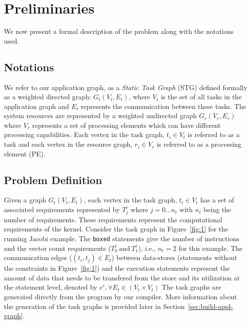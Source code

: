 \documentclass[10pt, conference, compsocconf]{IEEEtran}
\begin{document}
%
\IEEEpeerreviewmaketitle




\section{Preliminaries}
\label{sec:preliminaries}

We now present a formal description of the problem along with the
notations used.

\subsection{Notations}

We refer to our application graph, as a \textit{Static Task Graph} (STG)
defined formally as a weighted directed graph: $G_t(V_t, E_t)$, where
$V_t$ is the set of all tasks in the application graph and $E_t$
represents the communication between these tasks. The system resources
are represented by a weighted undirected graph $G_r(V_r, E_r)$ where
$V_r$ represents a set of processing elements which can have different
processing capabilities. Each vertex in the task graph, $t_i \in V_t$ is
referred to as a task and each vertex in the resource graph, $r_i \in
V_r$ is referred to as a processing element
(PE). %

\subsection{Problem Definition}

Given a graph $G_t(V_t, E_t)$, each vertex in the task graph, $t_i \in
V_t$ has a set of associated requirements represented by $T^{i}_{j}$
where $j=0...n_t$ with $n_t$ being the number of requirements. These
requirements represent the computational requirements of the
kernel. Consider the task graph in Figure~\ref{fig:1} for the running
Jacobi example. The \texttt{boxed} statements give the number of
instructions and the vector count requirements ($T^i_0\ \mathrm{and}\
T^i_1$), i.e., $n_t=2$ for this example. The communication edges ($(t_i,
t_j) \in E_t$) between data-stores (statements without the constraints
in Figure~\ref{fig:1}) and the execution statements represent the amount
of data that needs to be transfered from the store and its utilization
at the statement level, denoted by $e^c, \forall E_t \in (V_t \times
V_t)$ The task graphs are generated directly from the program by our
compiler. More information about the generation of the task graphs is
provided later in Section~\ref{sec:build-appl-graph}.
\end{document}
